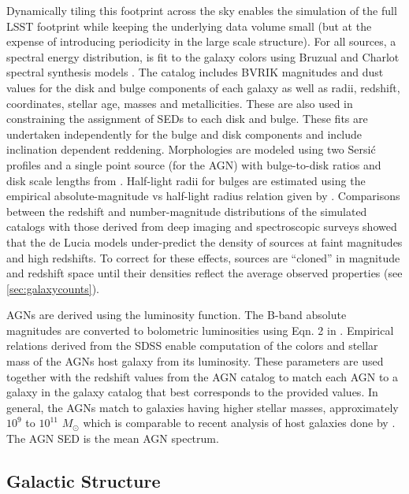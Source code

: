\documentclass[]{article}
\begin{document}
{Dynamically tiling this footprint across the sky enables the
simulation of the full LSST footprint while keeping the underlying
data volume small (but at the expense of introducing periodicity in
the large scale structure).  For all sources, a spectral energy
distribution, is fit to the galaxy colors using Bruzual and Charlot
spectral synthesis models \citep{bruzual}. The
\citet{delucia} catalog includes BVRIK magnitudes and dust values for
the disk and bulge components of each galaxy as well as radii,
redshift, coordinates, stellar age, masses and metallicities. These
are also used in constraining the assignment of SEDs to each disk and bulge.
These fits are undertaken independently for the bulge and disk components and
include inclination dependent reddening. Morphologies are modeled using two
Sersi{\'c} profiles and a single point source (for the AGN) with
bulge-to-disk ratios and disk scale lengths from \citet{delucia}.
 Half-light radii for bulges are estimated using the empirical
absolute-magnitude vs half-light radius relation given by 
\citet{gonzalez09}.  Comparisons between the redshift and
number-magnitude distributions of the simulated catalogs with those
derived from deep imaging and spectroscopic surveys showed that the de
Lucia models under-predict the density of sources at faint magnitudes
and high redshifts. To correct for these effects, sources are
``cloned'' in magnitude and redshift space until their densities
reflect the average observed properties (see
\ref{sec:galaxycounts}). 

AGNs are derived using the \citet{bongiorno12} luminosity function. The
B-band absolute magnitudes are converted to bolometric luminosities
using Eqn. 2 in \citet{hopkins07}. Empirical relations derived from the
SDSS enable computation of the colors and stellar mass of the AGNs
host galaxy from its luminosity. These parameters are used together
with the redshift values from the AGN catalog to match each AGN to a
galaxy in the galaxy catalog that best corresponds to the provided
values. In general, the AGNs match to galaxies having higher stellar
masses, approximately $10^{9}$ to $10^{11}$ $M_{\odot}$ which is
comparable to recent analysis of host galaxies done by \citet{xue11}. The
AGN SED is the \citet{vandenberk} mean AGN spectrum. 

\subsection{Galactic Structure \label{sec:stars}}

}
\end{document}
